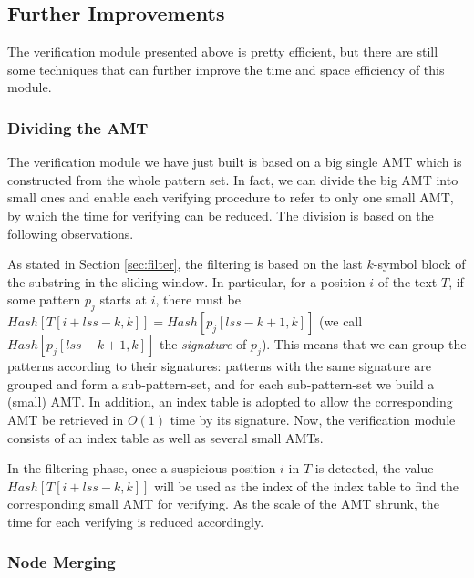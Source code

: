 \documentclass{article}
\begin{document}
\subsection{Further Improvements}
\label{sec:further improments}

The verification module presented above is pretty efficient, but there
are still some techniques that can further improve the time and space
efficiency of this module.

\subsubsection{Dividing the AMT}
\label{sec:divide amt}

The verification module we have just built is based on a big single
AMT which is constructed from the whole pattern set. In fact, we can
divide the big AMT into small ones and enable each verifying procedure
to refer to only one small AMT, by which the time for verifying can be
reduced. The division is based on the following observations.

As stated in Section \ref{sec:filter}, the filtering is based on the
last $k$-symbol block of the substring in the sliding window. In
particular, for a position $i$ of the text $T$, if some pattern $p_j$
starts at $i$, there must be
$Hash[T[i+lss-k,k]] = Hash[p_j[lss-k+1,k]]$ (we call
$Hash[p_j[lss-k+1,k]]$ the \emph{signature} of $p_j$). This means that
we can group the patterns according to their signatures: patterns with
the same signature are grouped and form a sub-pattern-set, and for
each sub-pattern-set we build a (small) AMT. In addition, an index
table is adopted to allow the corresponding AMT be retrieved in $O(1)$
time by its signature. Now, the verification module consists of an
index table as well as several small AMTs.

In the filtering phase, once a suspicious position $i$ in $T$ is
detected, the value $Hash[T[i+lss-k,k]]$ will be used as the index of
the index table to find the corresponding small AMT for verifying. As
the scale of the AMT shrunk, the time for each verifying is reduced
accordingly.

\subsubsection{Node Merging}
\label{sec:node merge}
\end{document}
